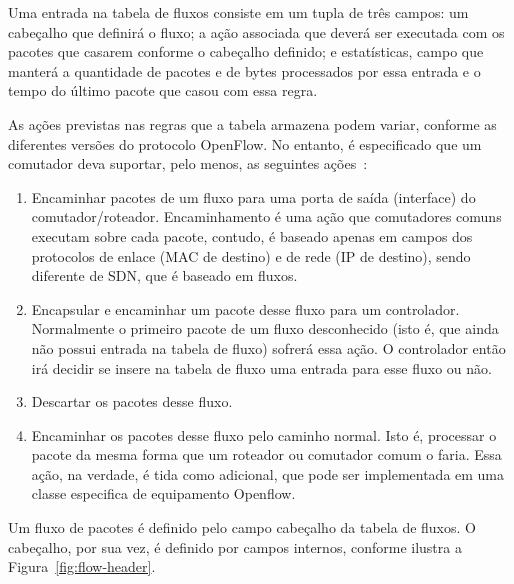 \documentclass[	12pt, Times, openright, twoside, a4paper, english, brazil]{abntex2}
\newcommand{\bko}[1]{{\color{red}{#1}}} %
\begin{document}
Uma entrada na tabela de fluxos consiste em um tupla de três campos: um cabeçalho que definirá o fluxo; a ação associada que deverá ser executada com os pacotes que casarem conforme o cabeçalho definido; e estatísticas, campo que manterá a quantidade de pacotes e de bytes processados por essa entrada e o tempo do último pacote que casou com essa regra. 

As ações previstas nas regras que a tabela armazena podem variar, conforme as diferentes versões do protocolo OpenFlow. No entanto, é especificado que um comutador deva suportar, pelo menos, as seguintes ações~\cite{OFSespec}:

\begin{enumerate}
    \item Encaminhar pacotes de um fluxo para uma porta de saída (interface) do comutador/roteador. Encaminhamento é uma ação que comutadores comuns executam sobre cada pacote, contudo, é baseado apenas em campos dos protocolos de enlace (MAC de destino) e de rede (IP de destino), sendo diferente de SDN, que é baseado em fluxos.
    \item Encapsular e encaminhar um pacote desse fluxo para um controlador. Normalmente o primeiro pacote de um fluxo desconhecido (isto é, que ainda não possui entrada na tabela de fluxo) sofrerá essa ação. O controlador então irá decidir se insere na tabela de fluxo uma entrada para esse fluxo ou não.\cite{McKeown}
    \item Descartar os pacotes desse fluxo.
    \item Encaminhar os pacotes desse fluxo pelo caminho normal. Isto é, processar o pacote da mesma forma que um roteador ou comutador comum o faria. Essa ação, na verdade, é tida como adicional, que pode ser implementada em uma classe especifica de equipamento Openflow.
\end{enumerate}




Um fluxo de pacotes é definido pelo campo cabeçalho da tabela de fluxos. O cabeçalho, por sua vez, é definido por campos internos, conforme ilustra a Figura~\ref{fig:flow-header}.
\end{document}
